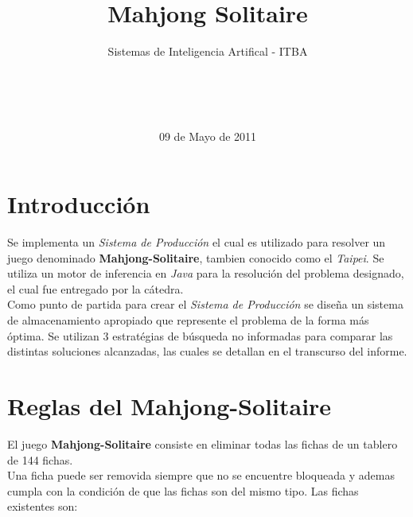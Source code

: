 \documentclass{sig-alternate}
\begin{document}

\title{Mahjong Solitaire}
\subtitle{Sistemas de Inteligencia Artifical - ITBA}


\author{
	\\
	\\
	\\
}

\date{09 de Mayo de 2011}

\maketitle

\section*{Introducci\'on}
	Se implementa un \textit{Sistema de Producci\'on} el cual es utilizado para resolver un juego denominado \textbf{Mahjong-Solitaire}, tambien conocido como el \textit{Taipei}. Se utiliza un motor de inferencia en \textit{Java} para la resoluci\'on del problema designado, el cual fue entregado por la c\'atedra. \\
	Como punto de partida para crear el \textit{Sistema de Producci\'on} se dise\~{n}a un sistema de almacenamiento apropiado que represente el problema de la forma m\'as \'optima. Se utilizan 3 estrat\'egias de b\'usqueda no informadas para comparar las distintas soluciones alcanzadas, las cuales se detallan en el transcurso del informe.

\section*{Reglas del Mahjong-Solitaire}
	El juego \textbf{Mahjong-Solitaire} consiste en eliminar todas las fichas de un tablero de 144 fichas. \\
	Una ficha puede ser removida siempre que no se encuentre bloqueada y ademas cumpla con la condici\'on de que las fichas son del mismo tipo. Las fichas existentes son:
\end{document}
